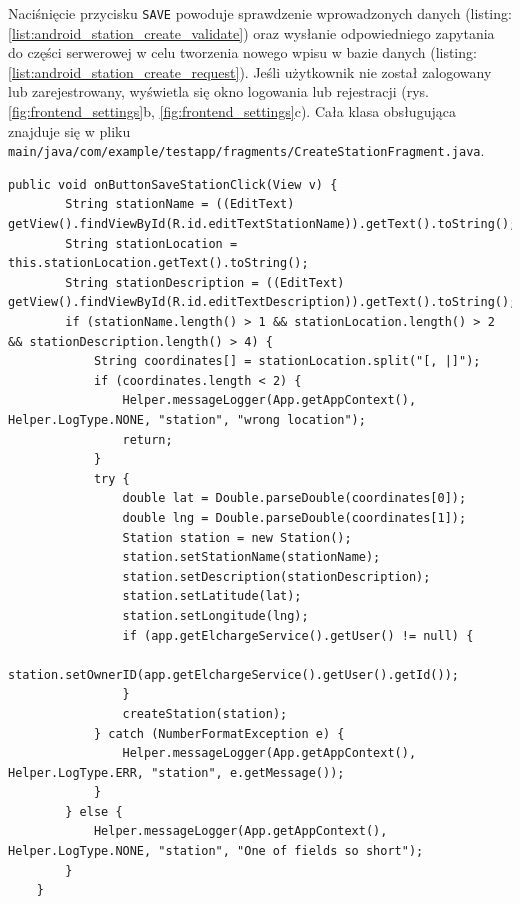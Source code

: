 Naciśnięcie przycisku \texttt{SAVE} powoduje sprawdzenie wprowadzonych danych (listing: \ref{list:android_station_create_validate}) oraz wysłanie odpowiedniego zapytania do części serwerowej w celu tworzenia nowego wpisu w bazie danych (listing: \ref{list:android_station_create_request}). Jeśli użytkownik nie został zalogowany lub zarejestrowany, wyświetla się okno logowania lub rejestracji (rys. \ref{fig:frontend_settings}b, \ref{fig:frontend_settings}c).
Cała klasa obsługująca znajduje się w pliku \texttt{main/java/com/example/testapp/fragments/CreateStationFragment.java}.
\begin{lstlisting}[label=list:android_station_create_validate,caption=Obsługa przycisku SAVE,basicstyle=\tiny\ttfamily]
    public void onButtonSaveStationClick(View v) {
        String stationName = ((EditText) getView().findViewById(R.id.editTextStationName)).getText().toString();
        String stationLocation = this.stationLocation.getText().toString();
        String stationDescription = ((EditText) getView().findViewById(R.id.editTextDescription)).getText().toString();
        if (stationName.length() > 1 && stationLocation.length() > 2 && stationDescription.length() > 4) {
            String coordinates[] = stationLocation.split("[, |]");
            if (coordinates.length < 2) {
                Helper.messageLogger(App.getAppContext(), Helper.LogType.NONE, "station", "wrong location");
                return;
            }
            try {
                double lat = Double.parseDouble(coordinates[0]);
                double lng = Double.parseDouble(coordinates[1]);
                Station station = new Station();
                station.setStationName(stationName);
                station.setDescription(stationDescription);
                station.setLatitude(lat);
                station.setLongitude(lng);
                if (app.getElchargeService().getUser() != null) {
                    station.setOwnerID(app.getElchargeService().getUser().getId());
                }
                createStation(station);
            } catch (NumberFormatException e) {
                Helper.messageLogger(App.getAppContext(), Helper.LogType.ERR, "station", e.getMessage());
            }
        } else {
            Helper.messageLogger(App.getAppContext(), Helper.LogType.NONE, "station", "One of fields so short");
        }
    }
\end{lstlisting}
